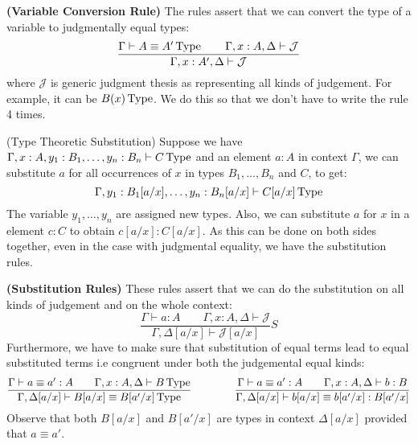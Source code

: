 \begin{definition}{\textbf{(Variable Conversion Rule)}}
    The rules assert that we can convert the type of a variable to judgmentally equal types:
    \begin{equation*}
        \frac{\Gamma\vdash A\equiv A'\operatorname{Type} \qquad\Gamma, x:A,\Delta\vdash\mathcal{J}}{\Gamma, x:A',\Delta\vdash\mathcal{J}}
    \end{equation*}
    where $\mathcal{J}$ is generic judgment thesis as representing all kinds of judgement. For example, it can be $B(x)\operatorname{Type} $. We do this so that we don't have to write the rule 4 times.
\end{definition}

\begin{remark}{{(Type Theoretic Substitution)}}
    Suppose we have $\Gamma,x:A,y_1:B_1,\dots,y_n:B_n \vdash C\operatorname{Type} $ and an element $a:A$ in context $\Gamma$, we can substitute $a$ for all occurrences of $x$ in types $B_1,\dots,B_n$ and $C$, to get:
    \begin{equation*}
        \Gamma,y_1:B_1[a/x],\dots,y_n:B_n[a/x]\vdash C[a/x]\operatorname{Type} 
    \end{equation*}
    The variable $y_1,\dots,y_n$ are assigned new types. Also, we can substitute $a$ for $x$ in a element $c:C$ to obtain $c[a/x]:C[a/x]$. As this can be done on both sides together, even in the case with judgmental equality, we have the substitution rules.
\end{remark}

\begin{definition}{\textbf{(Substitution Rules)}}
    These rules assert that we can do the substitution on all kinds of judgement and on the whole context:
    \begin{equation*}
        \frac{\Gamma\vdash a:A \qquad \Gamma, x:A,\Delta\vdash\mathcal{J}}{\Gamma,\Delta[a/x]\vdash\mathcal{J}[a/x]}S
    \end{equation*}
    Furthermore, we have to make sure that substitution of equal terms lead to equal substituted terms i.e congruent under both the judgemental equal kinds:
    \begin{equation*}
    \begin{aligned}
        \frac{\Gamma\vdash a\equiv a':A\qquad \Gamma,x:A,\Delta\vdash B\operatorname{Type} }{\Gamma,\Delta[a/x]\vdash B[a/x]\equiv B[a'/x]\operatorname{Type} } \qquad \qquad \frac{\Gamma\vdash a\equiv a':A \qquad \Gamma,x:A,\Delta\vdash b:B}{\Gamma,\Delta[a/x]\vdash b[a/x]\equiv b[a'/x]:B[a'/x]}
    \end{aligned}
    \end{equation*}
    Observe that both $B[a/x]$ and $B[a'/x]$ are types in context $\Delta[a/x]$ provided that $a\equiv a'$.
\end{definition}

